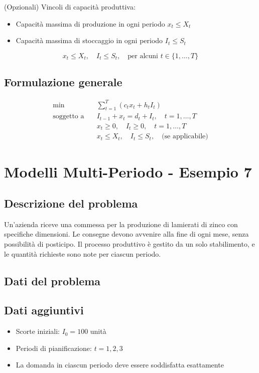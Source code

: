(Opzionali) Vincoli di capacità produttiva:
\begin{itemize}
    \item Capacità massima di produzione in ogni periodo $x_t \leq X_t$
    \item Capacità massima di stoccaggio in ogni periodo $I_t \leq S_t$
\end{itemize}

\[
x_t \leq X_t, \quad I_t \leq S_t, \quad \text{per alcuni } t \in \{1, \dots, T\}
\]

\subsection{Formulazione generale}
\[
\begin{aligned}
\min \quad & \sum_{t=1}^{T} \left( c_t x_t + h_t I_t \right) \\
\text{soggetto a} \quad 
& I_{t-1} + x_t = d_t + I_t, \quad t = 1, \dots, T \\
& x_t \geq 0, \quad I_t \geq 0, \quad t = 1, \dots, T \\
& x_t \leq X_t, \quad I_t \leq S_t, \quad \text{(se applicabile)}
\end{aligned}
\]

\section{Modelli Multi-Periodo - Esempio 7}

\subsection{Descrizione del problema}

Un'azienda riceve una commessa per la produzione di lamierati di zinco 
con specifiche dimensioni. Le consegne devono avvenire alla fine di ogni mese, 
senza possibilità di posticipo. Il processo produttivo è gestito da un 
solo stabilimento, e le quantità richieste sono note per ciascun periodo.

\subsection{Dati del problema}

\subsection{Dati aggiuntivi}
\begin{itemize}
    \item Scorte iniziali: $I_0 = 100$ unità
    \item Periodi di pianificazione: $t = 1, 2, 3$
    \item La domanda in ciascun periodo deve essere soddisfatta esattamente
\end{itemize}

